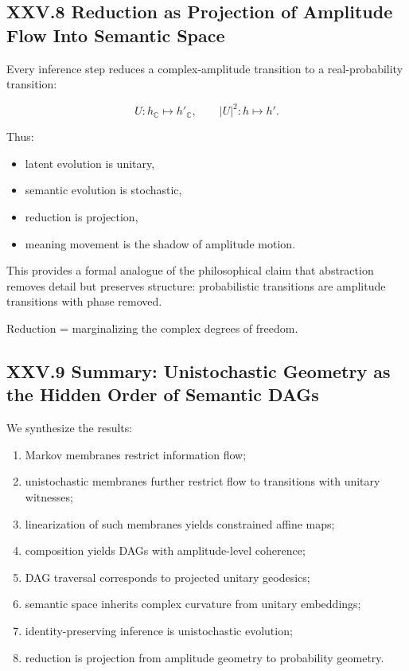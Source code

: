 \documentclass[11pt,letterpaper]{article}
\begin{document}
\subsection{XXV.8 Reduction as Projection of Amplitude Flow Into Semantic Space}

Every inference step reduces a complex-amplitude transition to a real-probability transition:

\[
U : h_{\mathbb{C}} \mapsto h'_{\mathbb{C}}, \qquad
|U|^2 : h \mapsto h'.
\]

Thus:

\begin{itemize}
    \item latent evolution is unitary,
    \item semantic evolution is stochastic,
    \item reduction is projection,
    \item meaning movement is the shadow of amplitude motion.
\end{itemize}

This provides a formal analogue of the philosophical claim that abstraction removes detail but preserves structure: probabilistic transitions are amplitude transitions with phase removed.

Reduction = marginalizing the complex degrees of freedom.

\subsection{XXV.9 Summary: Unistochastic Geometry as the Hidden Order of Semantic DAGs}

We synthesize the results:

\begin{enumerate}
    \item Markov membranes restrict information flow;  
    \item unistochastic membranes further restrict flow to transitions with unitary witnesses;
    \item linearization of such membranes yields constrained affine maps;
    \item composition yields DAGs with amplitude-level coherence;
    \item DAG traversal corresponds to projected unitary geodesics;
    \item semantic space inherits complex curvature from unitary embeddings;
    \item identity-preserving inference is unistochastic evolution;
    \item reduction is projection from amplitude geometry to probability geometry.
\end{enumerate}
\end{document}
